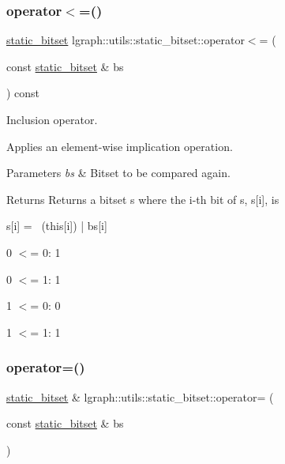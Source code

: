 \subsubsection{\texorpdfstring{operator$<$=()}{operator<=()}}
{\footnotesize\ttfamily \hyperlink{classlgraph_1_1utils_1_1static__bitset}{static\+\_\+bitset} lgraph\+::utils\+::static\+\_\+bitset\+::operator$<$= (\begin{DoxyParamCaption}\item[{const \hyperlink{classlgraph_1_1utils_1_1static__bitset}{static\+\_\+bitset} \&}]{bs }\end{DoxyParamCaption}) const}



Inclusion operator. 

Applies an element-\/wise implication operation.


\begin{DoxyParams}{Parameters}
{\em bs} & Bitset to be compared again. \\
\hline
\end{DoxyParams}
\begin{DoxyReturn}{Returns}
Returns a bitset s where the i-\/th bit of s, s\mbox{[}i\mbox{]}, is \begin{DoxyVerb}s[i] = ~(this[i]) | bs[i]
\end{DoxyVerb}

\begin{DoxyItemize}
\item 0 $<$= 0\+: 1
\item 0 $<$= 1\+: 1
\item 1 $<$= 0\+: 0
\item 1 $<$= 1\+: 1 
\end{DoxyItemize}
\end{DoxyReturn}
\mbox{\label{classlgraph_1_1utils_1_1static__bitset_a3215c8066fffcd8eed871914d42c40b8}} 
\subsubsection{\texorpdfstring{operator=()}{operator=()}}
{\footnotesize\ttfamily \hyperlink{classlgraph_1_1utils_1_1static__bitset}{static\+\_\+bitset} \& lgraph\+::utils\+::static\+\_\+bitset\+::operator= (\begin{DoxyParamCaption}\item[{const \hyperlink{classlgraph_1_1utils_1_1static__bitset}{static\+\_\+bitset} \&}]{bs }\end{DoxyParamCaption})}



